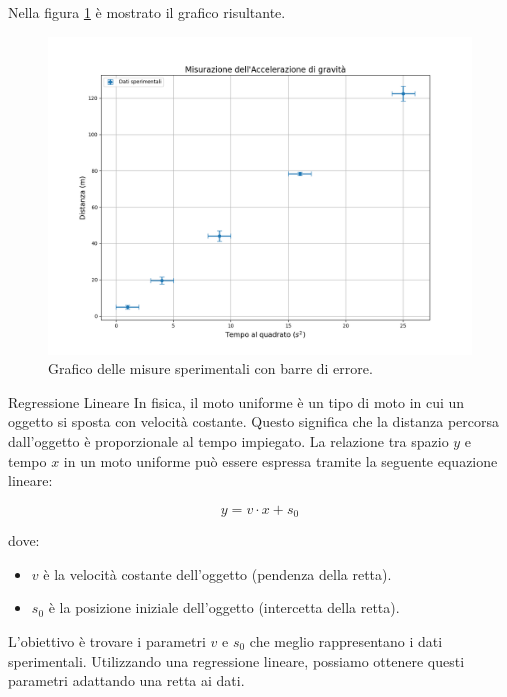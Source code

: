 \documentclass[12pt,a4paper,oneside]{book}
\makeatletter
\renewcommand{\section}{\@startsection{section}{1}{\z@}
{-4ex \@plus -1ex \@minus -.4ex}
{1ex \@plus.2ex }
{\normalfont\large\sffamily\bfseries}}
\theoremstyle{esercizio}
\makeatother
\begin{document}
Nella figura \ref{fig:grafico_misure} è mostrato il grafico risultante.

\begin{figure}[h!]
    \centering
    \includegraphics[width=\textwidth]{img/grafico_misure.png}
    \caption{Grafico delle misure sperimentali con barre di errore.}
    \label{fig:grafico_misure}
\end{figure}


\section{Regressione Lineare}
In fisica, il moto uniforme è un tipo di moto in cui un oggetto si sposta con velocità costante. Questo significa che la distanza percorsa dall'oggetto è proporzionale al tempo impiegato. La relazione tra spazio \( y \) e tempo \( x \) in un moto uniforme può essere espressa tramite la seguente equazione lineare:

\[
y = v \cdot x + s_0
\]

dove:
\begin{itemize}
    \item \( v \) è la velocità costante dell'oggetto (pendenza della retta).
    \item \( s_0 \) è la posizione iniziale dell'oggetto (intercetta della retta).
\end{itemize}

L'obiettivo è trovare i parametri \( v \) e \( s_0 \) che meglio rappresentano i dati sperimentali. Utilizzando una regressione lineare, possiamo ottenere questi parametri adattando una retta ai dati.
\end{document}
